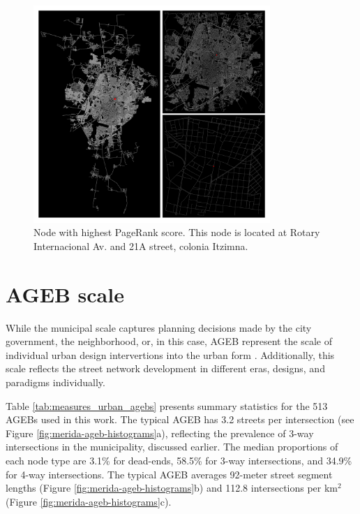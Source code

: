 \begin{figure}[h!]
	\centering
	\includegraphics[width=0.8\textwidth]{Figures/merida-node-pagerank.png}
	\caption{Node with highest PageRank score. This node is located at Rotary Internacional Av. and 21A street, colonia Itzimna.
		\label{fig:merida-max-node-pagerank}}
\end{figure}

\section{AGEB scale}

While the municipal scale captures planning decisions made by the city government, the neighborhood, or, in this case, AGEB represent the scale of individual urban design intervertions into the urban form \cite{boeing_multi-scale_2018}. Additionally, this scale reflects the street network development in different eras, designs, and paradigms individually.

Table \ref{tab:measures_urban_agebs} presents summary statistics for the 513 AGEBs used in this work. The typical AGEB has 3.2 streets per intersection (see Figure \ref{fig:merida-ageb-histograms}a), reflecting the prevalence of 3-way intersections in the municipality, discussed earlier. The median proportions of each node type are 3.1\% for dead-ends, 58.5\% for 3-way intersections, and 34.9\% for 4-way intersections. The typical AGEB averages 92-meter street segment lengths (Figure \ref{fig:merida-ageb-histograms}b) and 112.8 intersections per km$^2$ (Figure \ref{fig:merida-ageb-histograms}c).


